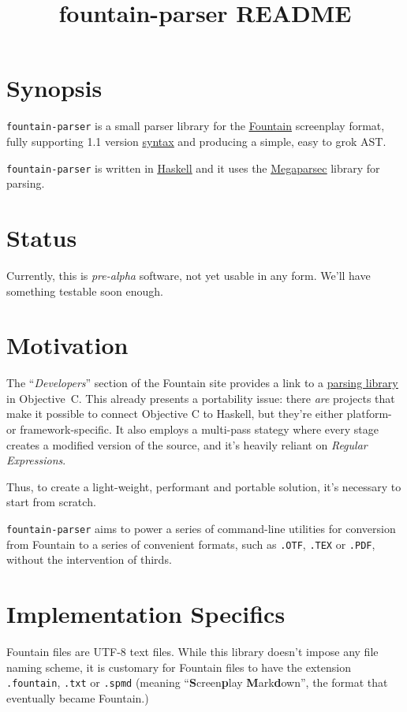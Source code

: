\documentclass[12pt]{article}
\newcommand{\link}[2]{\underline{\color{darkblue}\href{#1}{#2}}}
\begin{document}
\title{\textbf{fountain-parser README}}
\author{}
\date{}
\maketitle

\section*{Synopsis}
\texttt{fountain-parser} is a small parser library for the
\link{https://fountain.io/}{\textsf{Fountain}} screenplay format,
fully supporting 1.1 version
\link{https://fountain.io/syntax/}{syntax} and
producing a simple, easy to grok \textsf{AST}.

\texttt{fountain-parser} is written in
\link{https://haskell.org}{\textsf{Haskell}} and it uses the
\link{https://hackage.haskell.org/package/megaparsec}{\textsf{Megaparsec}}
library for parsing.

\section*{Status}
Currently, this is \emph{pre-alpha} software, not yet usable in
any form. We'll have something testable soon enough.

\section*{Motivation}
The ``\emph{Developers}'' section of the Fountain site provides a
link to a
\link{https://github.com/nyousefi/Fountain}{parsing library}
in \textsf{Objective~C}. This already presents a portability
issue: there \emph{are} projects that make it possible to connect
Objective C to Haskell, but they're either platform- or
framework-specific.  It also employs a multi-pass stategy where
every stage creates a modified version of the source, and it's
heavily reliant on \emph{Regular Expressions}.

Thus, to create a light-weight, performant and portable
solution, it's necessary to start from scratch.

\texttt{fountain-parser} aims to power a series of command-line
utilities for conversion from Fountain to a series of convenient
formats, such as \texttt{.OTF}, \texttt{.TEX} or \texttt{.PDF},
without the intervention of thirds.

\section*{Implementation Specifics}
Fountain files are \textsf{UTF-8} text files. While this library
doesn't impose any file naming scheme, it is customary for Fountain
files to have the extension \texttt{.fountain}, \texttt{.txt} or
\texttt{.spmd} (meaning
``\textbf{S}creen\textbf{p}lay \textbf{M}ark\textbf{d}own'',
the format that eventually became Fountain.)
\end{document}
